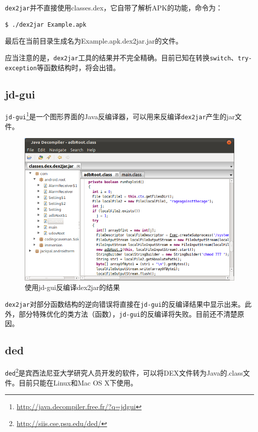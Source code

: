 \lstinline!dex2jar!并不直接使用classes.dex，它自带了解析APK的功能，命令为：
\begin{lstlisting}[language=bash, numbers=none]
 $ ./dex2jar Example.apk
\end{lstlisting}
最后在当前目录生成名为Example.apk.dex2jar.jar的文件。

应当注意的是，\lstinline!dex2jar!工具的结果并不完全精确。目前已知在转换\lstinline!switch!、\lstinline!try-exception!等函数结构时，将会出错。

\subsection{jd-gui}
\lstinline!jd-gui!\footnote{\url{http://java.decompiler.free.fr/?q=jdgui}}是一个图形界面的Java反编译器，可以用来反编译\lstinline!dex2jar!产生的jar文件。

\begin{figure}[htbp]
  \centering
  \includegraphics[width=14cm]{image/jd-gui.png}
  \caption{使用jd-gui反编译dex2jar的结果}
  \label{Fig:jd-gui}
\end{figure}

\lstinline!dex2jar!对部分函数结构的逆向错误将直接在\lstinline!jd-gui!的反编译结果中显示出来。此外，部分特殊优化的类方法（函数），\lstinline!jd-gui!的反编译将失败。目前还不清楚原因。

\subsection{ded}
\lstinline!ded!\footnote{\url{http://siis.cse.psu.edu/ded/}}是宾西法尼亚大学研究人员开发的软件，可以将DEX文件转为Java的.class文件。目前只能在Linux和Mac OS X下使用。

